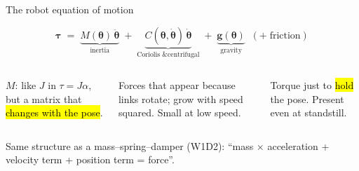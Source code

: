 \documentclass[aspectratio=169,10pt]{beamer}
\begin{document}
\begin{frame}[t]{The robot equation of motion}
\begin{eqbox}
\[ \bm\tau \;=\; \underbrace{M(\bm\theta)\,\ddot{\bm\theta}}_{\text{inertia}} \;+\; \underbrace{C(\bm\theta,\dot{\bm\theta})\,\dot{\bm\theta}}_{\text{Coriolis \& centrifugal}} \;+\; \underbrace{\bm g(\bm\theta)}_{\text{gravity}} \;\;(+\;\text{friction})\]
\end{eqbox}
\vspace{1mm}
\begin{columns}[T,onlytextwidth]
\begin{defbox}
\small $M$: like $J$ in $\tau=J\alpha$, but a matrix that \hl{changes with the pose}.
\end{defbox}
\begin{defbox}
\small Forces that appear because links rotate; grow with speed squared. Small at low speed.
\end{defbox}
\begin{defbox}
\small Torque just to \hl{hold} the pose. Present even at standstill.
\end{defbox}
\end{columns}
\vspace{1mm}
\begin{notebox}
Same structure as a mass--spring--damper (W1D2): ``mass $\times$ acceleration + velocity term + position term = force''.
\end{notebox}
\end{frame}
\end{document}
